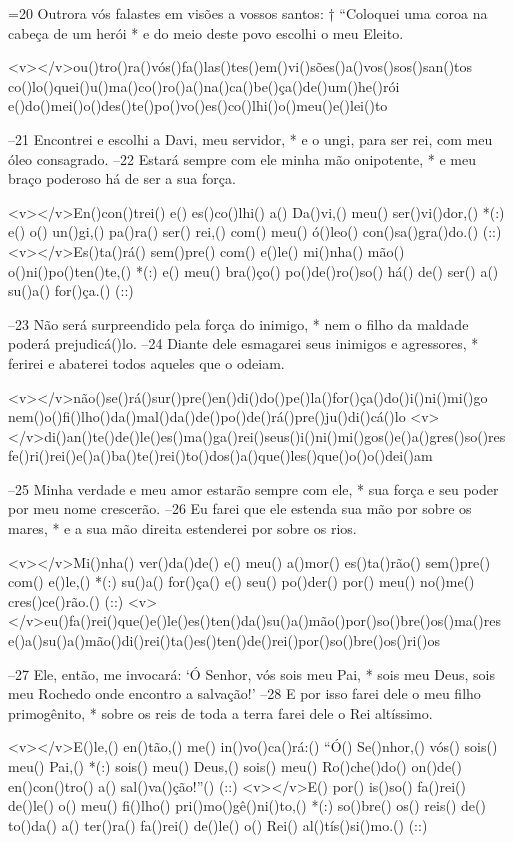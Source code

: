 =20 Outrora vós falastes em visões a vossos santos: †
“Coloquei uma coroa na cabeça de um herói *
e do meio deste povo escolhi o meu Eleito.

<v></v>ou()tro()ra()vós()fa()las()tes()em()vi()sões()a()vos()sos()san()tos
co()lo()quei()u()ma()co()ro()a()na()ca()be()ça()de()um()he()rói
e()do()mei()o()des()te()po()vo()es()co()lhi()o()meu()e()lei()to

–21 Encontrei e escolhi a Davi, meu servidor, *
e o ungi, para ser rei, com meu óleo consagrado.
–22 Estará sempre com ele minha mão onipotente, *
e meu braço poderoso há de ser a sua força.

<v></v>En()con()trei() e() es()co()lhi() a() Da()vi,() meu() ser()vi()dor,() *(:)
e() o() un()gi,() pa()ra() ser() rei,() com() meu() ó()leo() con()sa()gra()do.() (::)
<v></v>Es()ta()rá() sem()pre() com() e()le() mi()nha() mão() o()ni()po()ten()te,() *(:)
e() meu() bra()ço() po()de()ro()so() há() de() ser() a() su()a() for()ça.() (::)

–23 Não será surpreendido pela força do inimigo, *
nem o filho da maldade poderá prejudicá()lo.
–24 Diante dele esmagarei seus inimigos e agressores, *
ferirei e abaterei todos aqueles que o odeiam.

<v></v>não()se()rá()sur()pre()en()di()do()pe()la()for()ça()do()i()ni()mi()go
nem()o()fi()lho()da()mal()da()de()po()de()rá()pre()ju()di()cá()lo
<v></v>di()an()te()de()le()es()ma()ga()rei()seus()i()ni()mi()gos()e()a()gres()so()res
fe()ri()rei()e()a()ba()te()rei()to()dos()a()que()les()que()o()o()dei()am

–25 Minha verdade e meu amor estarão sempre com ele, *
sua força e seu poder por meu nome crescerão.
–26 Eu farei que ele estenda sua mão por sobre os mares, *
e a sua mão direita estenderei por sobre os rios.

<v></v>Mi()nha() ver()da()de() e() meu() a()mor() es()ta()rão() sem()pre() com() e()le,() *(:)
su()a() for()ça() e() seu() po()der() por() meu() no()me() cres()ce()rão.() (::)
<v></v>eu()fa()rei()que()e()le()es()ten()da()su()a()mão()por()so()bre()os()ma()res
e()a()su()a()mão()di()rei()ta()es()ten()de()rei()por()so()bre()os()ri()os

–27 Ele, então, me invocará: ‘Ó Senhor, vós sois meu Pai, *
sois meu Deus, sois meu Rochedo onde encontro a salvação!’
–28 E por isso farei dele o meu filho primogênito, *
sobre os reis de toda a terra farei dele o Rei altíssimo.

<v></v>E()le,() en()tão,() me() in()vo()ca()rá:() ``Ó() Se()nhor,() vós() sois() meu() Pai,() *(:)
sois() meu() Deus,() sois() meu() Ro()che()do() on()de() en()con()tro() a() sal()va()ção!''() (::)
<v></v>E() por() is()so() fa()rei() de()le() o() meu() fi()lho() pri()mo()gê()ni()to,() *(:)
so()bre() os() reis() de() to()da() a() ter()ra() fa()rei() de()le() o() Rei() al()tís()si()mo.() (::)

